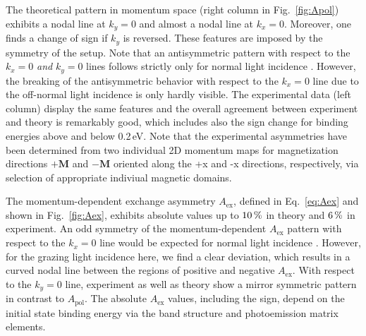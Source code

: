 \documentclass[prl,twocolumn,floatfix,superscriptaddress,aps]{revtex4-2}
\renewcommand{\vec}[1]{\boldsymbol{#1}}
\begin{document}
The theoretical pattern in momentum space (right column in Fig.~\ref{fig:Apol}) exhibits a nodal line at $k_{y} = 0$ and almost a nodal line at $k_{x} = 0$. Moreover, one finds a change of sign if $k_{y}$ is reversed. These features are imposed by the symmetry of the setup. Note that an antisymmetric pattern with respect to the $k_{x} = 0$ \textit{and} $k_{y} = 0$ lines follows strictly only for normal light incidence \cite{schumann2024}. However, the breaking of the antisymmetric behavior with respect to the $k_{x} = 0$ line due to the off-normal light incidence is only hardly visible. The experimental data (left column) display the same features and the overall agreement between experiment and theory is remarkably good, which includes also the sign change for binding energies above and below 0.2\,eV. Note that the experimental asymmetries have been determined from two individual 2D momentum maps for magnetization directions $+\vec{M}$ and $-\vec{M}$ oriented along the +x and -x directions, respectively, via selection of appropriate indiviual magnetic domains.

The momentum-dependent exchange asymmetry $A_{\mathrm{ex}}$, defined in Eq.~\eqref{eq:Aex} and shown in Fig.~\ref{fig:Aex}, exhibits absolute values up to $\unit[10]{\%}$ in theory and $\unit[6]{\%}$ in experiment. An odd symmetry of the momentum-dependent $A_{\mathrm{ex}}$ pattern with respect to the $k_{x} = 0$ line would be expected for normal light incidence \cite{schumann2024}. However, for the grazing light incidence here, we find a clear deviation, which results in a curved nodal line between the regions of positive and negative $A_{\mathrm{ex}}$. With respect to the $k_{y} = 0$ line, experiment as well as theory show a mirror symmetric pattern in contrast to $A_{\mathrm{pol}}$. The absolute $A_{\mathrm{ex}}$ values, including the sign, depend on the initial state binding energy via the band structure and photoemission matrix elements.
\end{document}
